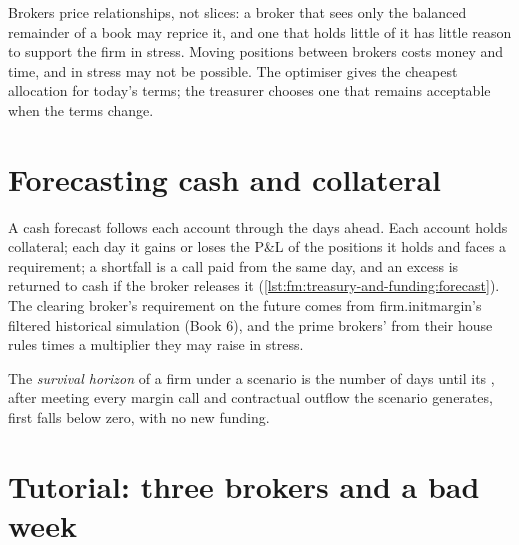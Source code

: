 \begin{remark}\label{rem:fm:treasury-and-funding:limits}
Brokers price relationships, not slices: a broker that sees only the balanced remainder of a book may reprice it, and one that holds little of it
has little reason to support the firm in stress. Moving positions between brokers costs money and time, and in stress may not be possible. The
optimiser gives the cheapest allocation for today's terms; the treasurer chooses one that remains acceptable when the terms change.
\end{remark}

\section{Forecasting cash and collateral}

A cash forecast follows each account through the days ahead. Each account holds collateral; each day it gains or loses the P\&L of the positions it
holds and faces a requirement; a shortfall is a call paid from  the same day, and an excess is returned to cash if the broker
releases it (\cref{lst:fm:treasury-and-funding:forecast}). The clearing broker's requirement on the future comes from firm.initmargin's filtered
historical simulation (Book 6), and the prime brokers' from their house rules times a multiplier they may raise in stress.

\label{lst:fm:treasury-and-funding:forecast}

\begin{definition}\label{def:fm:treasury-and-funding:horizon}
The \emph{survival horizon} of a firm under a scenario is the number of days until its , after meeting
every margin call and contractual outflow the scenario generates, first falls below zero, with no new funding.
\end{definition}

\section{Tutorial: three brokers and a bad week}\label{tut:fm:treasury-and-funding:tut}

